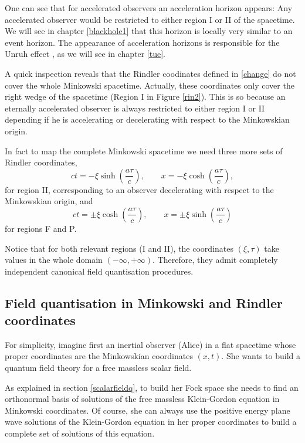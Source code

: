 One can see that for accelerated observers an acceleration horizon appears: Any accelerated observer would be restricted to either region I or II of the spacetime. We will see in chapter \ref{blackhole1} that this horizon is locally very similar to an event horizon. The appearance of acceleration horizons is responsible for the Unruh effect \cite{Unruh}, as we will see in chapter \ref{tue}.  

A quick inspection reveals that the Rindler coodinates defined in \eqref{change} do not cover the whole Minkowski spacetime. Actually, these coordinates only cover the right wedge of the spacetime (Region I in Figure \ref{rin2}). This is so because an eternally  accelerated observer is always restricted to either region I or II depending if he is accelerating or decelerating with respect to the Minkowskian origin.

In fact to map the complete Minkowski spacetime we need three more sets of Rindler coordinates,
\begin{equation}\label{changeII}
ct=-\xi \sinh\left(\frac{a\tau}{c}\right),\qquad x=-\xi\cosh\left(\frac{a\tau}{c}\right),
\end{equation}
for region II, corresponding to an observer decelerating with respect to the Minkowskian origin, and
\begin{equation}\label{changeFP}
ct=\pm\xi \cosh\left(\frac{a\tau}{c}\right),\qquad x=\pm\xi\sinh\left(\frac{a\tau}{c}\right)
\end{equation}
for regions F and P.

Notice that for both relevant regions (I and II), the coordinates $(\xi,\tau)$ take values in the whole domain $(-\infty,+\infty)$. Therefore, they admit completely independent canonical field quantisation procedures. 


\subsection{Field quantisation in Minkowski and Rindler coordinates}

For simplicity, imagine first an inertial observer (Alice) in a flat spacetime whose proper coordinates are the Minkowskian coordinates $(x,t)$. She wants to build a quantum field theory for a free massless scalar field. 

As explained in section \ref{scalarfieldq}, to build her Fock space she needs to find an orthonormal basis of solutions of the free massless Klein-Gordon equation in Minkowski coordinates. Of course, she can always use the positive energy plane wave solutions of the Klein-Gordon equation in her proper coordinates to build a complete set of solutions of this equation.

